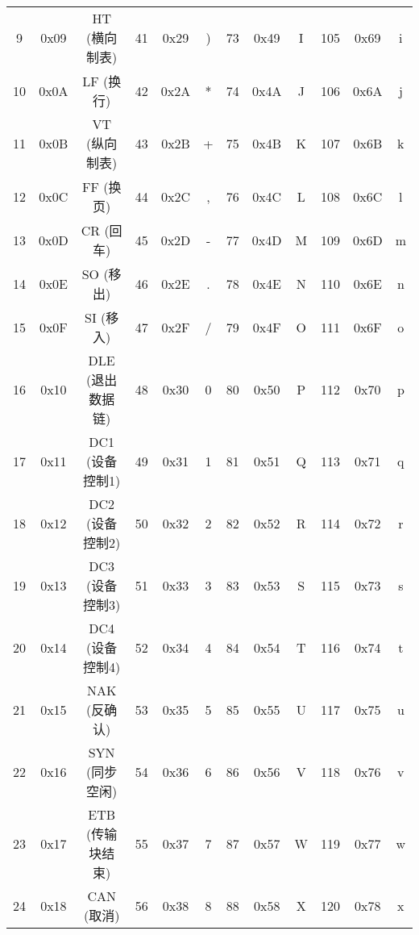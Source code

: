 \documentclass[a4paper, twoside]{article}
\begin{document}
\begin{table}[h]
\begin{tabular}{|c c c|c c c|c c c|c c c|}
            9  & 0x09 & HT (横向制表)     & 41  & 0x29 & )          & 73  & 0x49 & I           & 105  & 0x69 & i            \\
        10  & 0x0A & LF (换行)         & 42  & 0x2A & *          & 74  & 0x4A & J           & 106  & 0x6A & j            \\
        11  & 0x0B & VT (纵向制表)     & 43  & 0x2B & +          & 75  & 0x4B & K           & 107  & 0x6B & k            \\
        12  & 0x0C & FF (换页)         & 44  & 0x2C & ,          & 76  & 0x4C & L           & 108  & 0x6C & l            \\
        13  & 0x0D & CR (回车)         & 45  & 0x2D & -          & 77  & 0x4D & M           & 109  & 0x6D & m            \\
        14  & 0x0E & SO (移出)         & 46  & 0x2E & .          & 78  & 0x4E & N           & 110  & 0x6E & n            \\
        15  & 0x0F & SI (移入)         & 47  & 0x2F & /          & 79  & 0x4F & O           & 111  & 0x6F & o            \\
        16  & 0x10 & DLE (退出数据链)  & 48  & 0x30 & 0          & 80  & 0x50 & P           & 112  & 0x70 & p            \\
        17  & 0x11 & DC1 (设备控制1)   & 49  & 0x31 & 1          & 81  & 0x51 & Q           & 113  & 0x71 & q            \\
        18  & 0x12 & DC2 (设备控制2)   & 50  & 0x32 & 2          & 82  & 0x52 & R           & 114  & 0x72 & r            \\
        19  & 0x13 & DC3 (设备控制3)   & 51  & 0x33 & 3          & 83  & 0x53 & S           & 115  & 0x73 & s            \\
        20  & 0x14 & DC4 (设备控制4)   & 52  & 0x34 & 4          & 84  & 0x54 & T           & 116  & 0x74 & t            \\
        21  & 0x15 & NAK (反确认)      & 53  & 0x35 & 5          & 85  & 0x55 & U           & 117  & 0x75 & u            \\
        22  & 0x16 & SYN (同步空闲)    & 54  & 0x36 & 6          & 86  & 0x56 & V           & 118  & 0x76 & v            \\
        23  & 0x17 & ETB (传输块结束)  & 55  & 0x37 & 7          & 87  & 0x57 & W           & 119  & 0x77 & w            \\
        24  & 0x18 & CAN (取消)        & 56  & 0x38 & 8          & 88  & 0x58 & X           & 120  & 0x78 & x            \\

\end{tabular}
\end{table}
\end{document}
